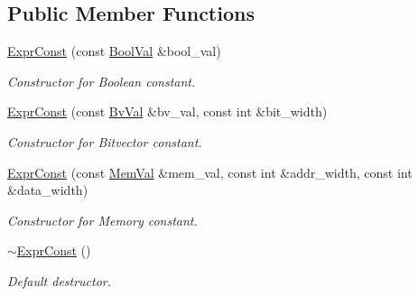 \subsection*{Public Member Functions}
\begin{DoxyCompactItemize}
\item 
\mbox{\label{classilang_1_1_expr_const_a8162a085cd0ee2672cdfa7e73094c442}} 
\mbox{\hyperlink{classilang_1_1_expr_const_a8162a085cd0ee2672cdfa7e73094c442}{Expr\+Const}} (const \mbox{\hyperlink{classilang_1_1_bool_val}{Bool\+Val}} \&bool\+\_\+val)
\begin{DoxyCompactList}\small\item\em Constructor for Boolean constant. \end{DoxyCompactList}\item 
\mbox{\label{classilang_1_1_expr_const_ad45721421e062b451c79dcba0470cc1f}} 
\mbox{\hyperlink{classilang_1_1_expr_const_ad45721421e062b451c79dcba0470cc1f}{Expr\+Const}} (const \mbox{\hyperlink{classilang_1_1_bv_val}{Bv\+Val}} \&bv\+\_\+val, const int \&bit\+\_\+width)
\begin{DoxyCompactList}\small\item\em Constructor for Bitvector constant. \end{DoxyCompactList}\item 
\mbox{\label{classilang_1_1_expr_const_aeeee86c1f8b8e670c9e33efeea016f0a}} 
\mbox{\hyperlink{classilang_1_1_expr_const_aeeee86c1f8b8e670c9e33efeea016f0a}{Expr\+Const}} (const \mbox{\hyperlink{classilang_1_1_mem_val}{Mem\+Val}} \&mem\+\_\+val, const int \&addr\+\_\+width, const int \&data\+\_\+width)
\begin{DoxyCompactList}\small\item\em Constructor for Memory constant. \end{DoxyCompactList}\item 
\mbox{\label{classilang_1_1_expr_const_a853838826146785a00941fbb52138557}} 
\mbox{\hyperlink{classilang_1_1_expr_const_a853838826146785a00941fbb52138557}{$\sim$\+Expr\+Const}} ()
\begin{DoxyCompactList}\small\item\em Default destructor. \end{DoxyCompactList}\item 

\end{DoxyCompactItemize}
